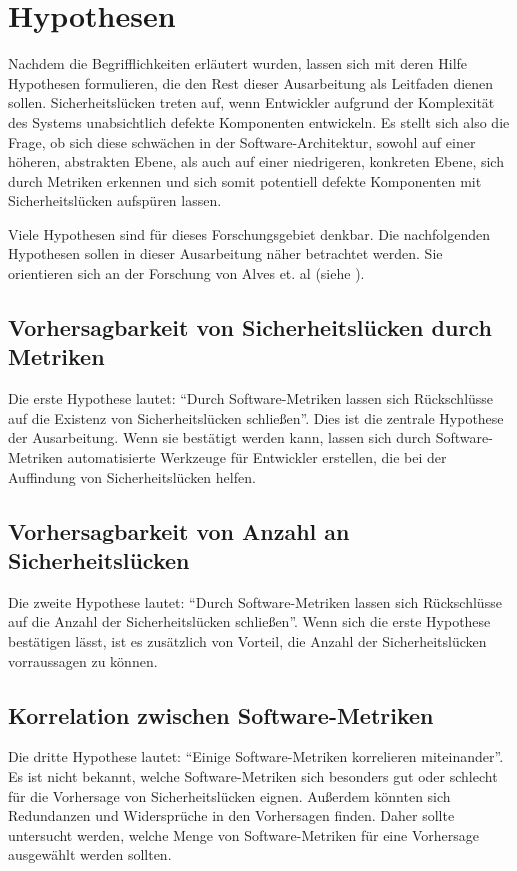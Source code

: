 \section{Hypothesen}
\label{sec:hypothesen}
Nachdem die Begrifflichkeiten erläutert wurden, lassen sich mit deren Hilfe Hypothesen formulieren, die den Rest dieser Ausarbeitung als Leitfaden dienen sollen.
Sicherheitslücken treten auf, wenn Entwickler aufgrund der Komplexität des Systems unabsichtlich defekte Komponenten entwickeln.
Es stellt sich also die Frage, ob sich diese schwächen in der Software-Architektur,
sowohl auf einer höheren, abstrakten Ebene, als auch auf einer niedrigeren, konkreten Ebene,
sich durch Metriken erkennen und sich somit potentiell defekte Komponenten mit Sicherheitslücken aufspüren lassen.

Viele Hypothesen sind für dieses Forschungsgebiet denkbar.
Die nachfolgenden Hypothesen sollen in dieser Ausarbeitung näher betrachtet werden.
Sie orientieren sich an der Forschung von Alves et. al (siehe \cite{alves_et_al}).

\subsection{Vorhersagbarkeit von Sicherheitslücken durch Metriken}
Die erste Hypothese lautet: "`Durch Software-Metriken lassen sich Rückschlüsse auf die Existenz von Sicherheitslücken schließen"'.
Dies ist die zentrale Hypothese der Ausarbeitung.
Wenn sie bestätigt werden kann, lassen sich durch Software-Metriken automatisierte Werkzeuge für Entwickler erstellen, die bei der Auffindung von Sicherheitslücken helfen.

\subsection{Vorhersagbarkeit von Anzahl an Sicherheitslücken}
Die zweite Hypothese lautet: "`Durch Software-Metriken lassen sich Rückschlüsse auf die Anzahl der Sicherheitslücken schließen"'.
Wenn sich die erste Hypothese bestätigen lässt, ist es zusätzlich von Vorteil, die Anzahl der Sicherheitslücken vorraussagen zu können.

\subsection{Korrelation zwischen Software-Metriken}
Die dritte Hypothese lautet: "`Einige Software-Metriken korrelieren miteinander"'.
Es ist nicht bekannt, welche Software-Metriken sich besonders gut oder schlecht für die Vorhersage von Sicherheitslücken eignen.
Außerdem könnten sich Redundanzen und Widersprüche in den Vorhersagen finden.
Daher sollte untersucht werden, welche Menge von Software-Metriken für eine Vorhersage ausgewählt werden sollten.
